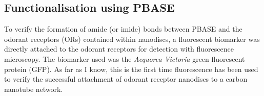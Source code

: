 \documentclass[
  a4paper,
]{scrbook}
\begin{document}
\hypertarget{sec-PBASE-GFP-OR-attachment}{%
\subsection{Functionalisation using
PBASE}\label{sec-PBASE-GFP-OR-attachment}}

To verify the formation of amide (or imide) bonds between PBASE and the
odorant receptors (ORs) contained within nanodiscs, a fluorescent
biomarker was directly attached to the odorant receptors for detection
with fluorescence microscopy. The biomarker used was the \emph{Aequorea
Victoria} green fluorescent protein (GFP). As far as I know, this is the
first time fluorescence has been used to verify the successful
attachment of odorant receptor nanodiscs to a carbon nanotube network.

\begin{figure}

\begin{minipage}[t]{0.47\linewidth}

{\centering 


}

\subcaption{\label{fig-PBASE-GFP-OR-ch3-zoom}}
\end{minipage}%
%
\begin{minipage}[t]{0.05\linewidth}

{\centering 

~

}


\end{minipage}
\end{figure}
\end{document}
